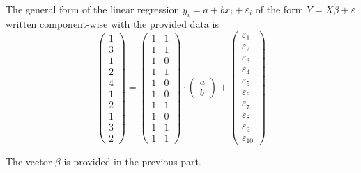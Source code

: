 \documentclass[12pt,twoside]{article}
\begin{document}
\begin{problems}
\begin{problemparts}
The general form of the linear regression $y_i = a + b x_i + \varepsilon_i$ of
the form $Y = X \beta + \varepsilon$ written component-wise with the provided 
data is 
$$ \begin{pmatrix}
    1 \\
    3 \\
    1 \\
    2 \\
    4 \\
    1 \\
    2 \\
    1 \\
    3 \\
    2 \end{pmatrix} = \boxed{\begin{pmatrix}
    1 & 1 \\
    1 & 1 \\
    1 & 0 \\
    1 & 1 \\
    1 & 0 \\
    1 & 0 \\
    1 & 1 \\
    1 & 0 \\
    1 & 1 \\
    1 & 1 \end{pmatrix}} \cdot \boxed{\begin{pmatrix}
    a \\
    b \end{pmatrix}} + \begin{pmatrix}
    \varepsilon_1 \\
    \varepsilon_2 \\
    \varepsilon_3 \\
    \varepsilon_4 \\
    \varepsilon_5 \\
    \varepsilon_6 \\
    \varepsilon_7 \\
    \varepsilon_8 \\
    \varepsilon_9 \\
    \varepsilon_{10} \end{pmatrix} $$

\problempart %

The vector $\beta$ is provided in the previous part.

\problempart %


\end{problemparts}
\end{problems}
\end{document}
